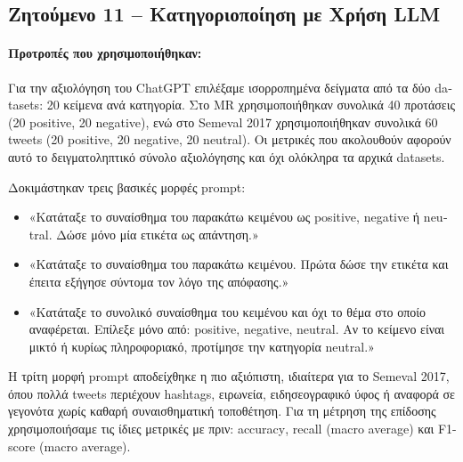 \documentclass[11pt,a4paper]{article}
\begin{document}
\subsection*{Ζητούμενο 11 -- Κατηγοριοποίηση με Χρήση \textlatin{LLM}}


\paragraph{Προτροπές που χρησιμοποιήθηκαν:}

Για την αξιολόγηση του \textlatin{ChatGPT} επιλέξαμε ισορροπημένα δείγματα από τα δύο \textlatin{datasets}: 20 κείμενα ανά κατηγορία. Στο \textlatin{MR} χρησιμοποιήθηκαν συνολικά 40 προτάσεις (20 \textlatin{positive}, 20 \textlatin{negative}), ενώ στο \textlatin{Semeval 2017} χρησιμοποιήθηκαν συνολικά 60 \textlatin{tweets} (20 \textlatin{positive}, 20 \textlatin{negative}, 20 \textlatin{neutral}). Οι μετρικές που ακολουθούν αφορούν αυτό το δειγματοληπτικό σύνολο αξιολόγησης και όχι ολόκληρα τα αρχικά \textlatin{datasets}.

Δοκιμάστηκαν τρεις βασικές μορφές \textlatin{prompt}:
\begin{itemize}
  \item «Κατάταξε το συναίσθημα του παρακάτω κειμένου ως \textlatin{positive}, \textlatin{negative} ή \textlatin{neutral}. Δώσε μόνο μία ετικέτα ως απάντηση.»
  \item «Κατάταξε το συναίσθημα του παρακάτω κειμένου. Πρώτα δώσε την ετικέτα και έπειτα εξήγησε σύντομα τον λόγο της απόφασης.»
  \item «Κατάταξε το συνολικό συναίσθημα του κειμένου και όχι το θέμα στο οποίο αναφέρεται. Επίλεξε μόνο από: \textlatin{positive}, \textlatin{negative}, \textlatin{neutral}. Αν το κείμενο είναι μικτό ή κυρίως πληροφοριακό, προτίμησε την κατηγορία \textlatin{neutral}.»
\end{itemize}

Η τρίτη μορφή \textlatin{prompt} αποδείχθηκε η πιο αξιόπιστη, ιδιαίτερα για το \textlatin{Semeval 2017}, όπου πολλά \textlatin{tweets} περιέχουν \textlatin{hashtags}, ειρωνεία, ειδησεογραφικό ύφος ή αναφορά σε γεγονότα χωρίς καθαρή συναισθηματική τοποθέτηση. Για τη μέτρηση της επίδοσης χρησιμοποιήσαμε τις ίδιες μετρικές με πριν: \textlatin{accuracy}, \textlatin{recall (macro average)} και \textlatin{F1-score (macro average)}.
\end{document}
